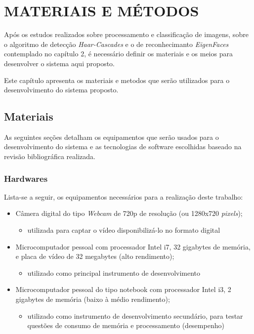 
\chapter{MATERIAIS E MÉTODOS}\label{ch:materiais-metodos}
Após os estudos realizados sobre processamento e classificação de imagens, sobre o algoritmo de detecção \textit{Haar-Cascades} e o de reconhecimanto \textit{EigenFaces} contemplado no capítulo 2, é necessário definir os materiais e os meios para desenvolver o sistema aqui proposto.

Este capítulo apresenta os materiais e metodos que serão utilizados para o desenvolvimento do sistema proposto.


\section{Materiais}\label{sec: tec-ferramenta}
As seguintes seções detalham os equipamentos que serão usados para o desenvolvimento do sistema e as tecnologias de software escolhidas baseado na revisão bibliográfica realizada.

\subsection{Hardwares}\label{sub-hardw}
Lista-se a seguir, os equipamentos necessários para a realização deste trabalho:

\begin{itemize}
	
	\item Câmera digital do tipo \textit{Webcam} de 720p de resolução (ou 1280x720 \textit{pixels});
	\begin{itemize}
		\item utilizada para captar o vídeo disponibilizá-lo no formato digital
	\end{itemize}

	\item Microcomputador pessoal com processador Intel i7, 32 gigabytes de memória, e placa de vídeo de 32 megabytes (alto rendimento);
	\begin{itemize}
		\item utilizado como principal instrumento de desenvolvimento
	\end{itemize}
	
	\item Microcomputador pessoal do tipo notebook com processador Intel i3, 2 gigabytes de memória (baixo à médio rendimento);
	\begin{itemize}
		\item utilizado como instrumento de desenvolvimento secundário, para testar questões de consumo de memória e processamento (desempenho)	
	\end{itemize}
	
\end{itemize}

